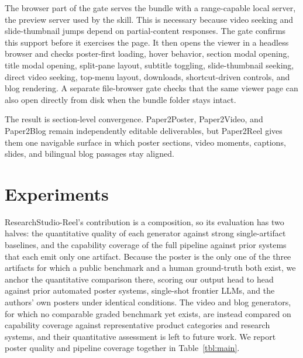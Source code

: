 \documentclass{article}
\begin{document}
The browser part of the gate serves the bundle with a range-capable local server, the preview server used by the skill. This is necessary because video seeking and slide-thumbnail jumps depend on partial-content responses. The gate confirms this support before it exercises the page. It then opens the viewer in a headless browser and checks poster-first loading, hover behavior, section modal opening, title modal opening, split-pane layout, subtitle toggling, slide-thumbnail seeking, direct video seeking, top-menu layout, downloads, shortcut-driven controls, and blog rendering. A separate file-browser gate checks that the same viewer page can also open directly from disk when the bundle folder stays intact.

The result is section-level convergence. Paper2Poster, Paper2Video, and Paper2Blog remain independently editable deliverables, but Paper2Reel gives them one navigable surface in which poster sections, video moments, captions, slides, and bilingual blog passages stay aligned.

\section{Experiments}\label{sec:experiments}

ResearchStudio-Reel's contribution is a composition, so its evaluation has two halves: the quantitative quality of each generator against strong single-artifact baselines, and the capability coverage of the full pipeline against prior systems that each emit only one artifact. Because the poster is the only one of the three artifacts for which a public benchmark and a human ground-truth both exist, we anchor the quantitative comparison there, scoring our output head to head against prior automated poster systems, single-shot frontier LLMs, and the authors' own posters under identical conditions. The video and blog generators, for which no comparable graded benchmark yet exists, are instead compared on capability coverage against representative product categories and research systems, and their quantitative assessment is left to future work. We report poster quality and pipeline coverage together in Table~\ref{tbl:main}.
\end{document}
